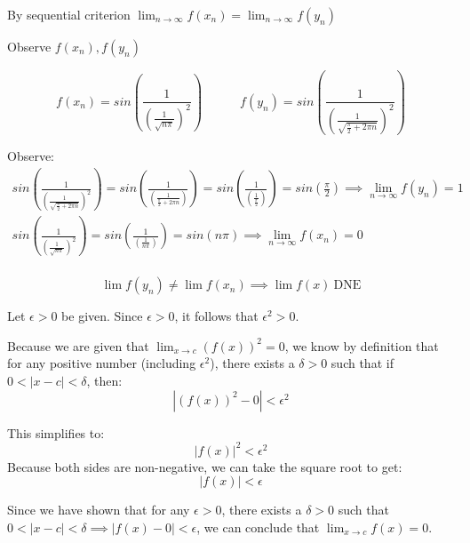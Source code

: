 By sequential criterion $\lim_{n \to \infty}  f(x_n) = \lim_{n \to \infty} f(y_n)$

Observe $f(x_n), f(y_n)$

\[
        f(x_n) = sin 
        \left( 
            \frac{1}{\left( \frac{1}{\sqrt{n\pi}} \right)^2}
        \right)
        \quad \quad \quad
        f(y_n) = sin 
        \left( 
            \frac{1}{\left( \frac{1}{\sqrt{\frac{\pi}{2}+2 \pi n}} \right)^2}
        \right)
\] 

Observe:
\[
\begin{gathered}
    sin 
    \left( 
        \frac{1}{\left( \frac{1}{\sqrt{\frac{\pi}{2}+2 \pi n}} \right)^2}
    \right) 
   =
   sin
    \left( 
        \frac{1}{\left( \frac{1}{\frac{\pi}{2}+2 \pi n} \right)}
    \right) 
    =
   sin
    \left( 
        \frac{1}{\left( \frac{1}{\frac{\pi}{2}} \right)}
    \right) 
    = sin \left( \frac{\pi}{2} \right) 
    \implies \lim_{n \to \infty} f(y_n) = 1 \\
    sin
    \left(  
        \frac{1}{\left( \frac{1}{\sqrt{n\pi}} \right)^2} 
    \right) 
    = sin
    \left(  
        \frac{1}{\left( \frac{1}{n\pi} \right)} 
    \right) 
    = sin
    \left(  n\pi  \right)  \implies \lim_{n \to \infty} f(x_n) = 0 \\
\end{gathered}
\] 

\[
    \lim f(y_n) \neq  \lim f(x_n) \implies \lim f(x) ~\text{DNE}
\] 
\qq



Let $\epsilon > 0$ be given. Since $\epsilon > 0$, it follows that $\epsilon^2 > 0$. 

Because we are given that $\lim_{x \to c} (f(x))^2 = 0$, we know by definition that for any positive number (including $\epsilon^2$), there exists a $\delta > 0$ such that if $0 < |x - c| < \delta$, then:
$$|(f(x))^2 - 0| < \epsilon^2$$

This simplifies to:
$$|f(x)|^2 < \epsilon^2$$
Because both sides are non-negative, we can take the square root to get:
$$|f(x)| < \epsilon$$

Since we have shown that for any $\epsilon > 0$, there exists a $\delta > 0$ such that $0 < |x - c| < \delta \implies |f(x) - 0| < \epsilon$, we can conclude that $\lim_{x \to c} f(x) = 0$. \\

